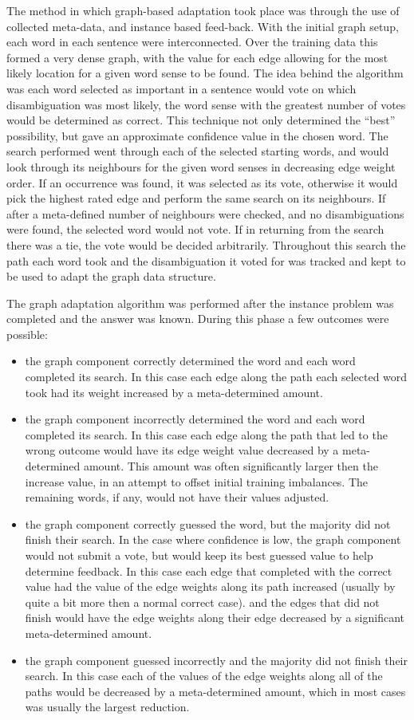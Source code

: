 The method in which graph-based adaptation took place was through the use of
collected meta-data, and instance based feed-back.  With the initial graph
setup, each word in each sentence were interconnected. Over the training data
this formed a very dense graph, with the value for each edge allowing for the
most likely location for a given word sense to be found.  The idea behind the
algorithm was each word selected as important in a sentence would vote on which
disambiguation was most likely, the word sense with the greatest number of votes
would be determined as correct.  This technique not only determined the ``best''
possibility, but gave an approximate confidence value in the chosen word. The
search performed went through each of the selected starting words, and would
look through its neighbours for the given word senses in decreasing edge weight
order. If an occurrence was found, it was selected as its vote, otherwise it
would pick the highest rated edge and perform the same search on its neighbours.
If after a meta-defined number of neighbours were checked, and no
disambiguations were found, the selected word would not vote.  If in returning
from the search there was a tie, the vote would be decided arbitrarily.
Throughout this search the path each word took and the disambiguation it voted
for was tracked and kept to be used to adapt the graph data structure.

The graph adaptation algorithm was performed after the instance problem was
completed and the answer was known.  During this phase a few outcomes were
possible: \begin{itemize}      \item the graph component correctly determined
the word and each word completed its search.  In this case each edge along the
path each selected word took had its weight increased by a meta-determined
amount.      \item the graph component incorrectly determined the word and each
word completed its search. In this case each edge along the path that led to the
wrong outcome would have its edge weight value decreased by a meta-determined
amount. This amount was often significantly larger then the increase value, in
an attempt to offset initial training imbalances. The remaining words, if any,
would not have their values adjusted.     \item the graph component correctly
guessed the word, but the majority did not finish their search. In the case
where confidence is low, the graph component would not submit a vote, but would
keep its best guessed value to help determine feedback. In this case each edge
that completed with the correct value had the value of the edge weights along
its path increased (usually by quite a bit more then a normal correct case). and
the edges that did not finish would have the edge weights along their edge
decreased by a significant meta-determined amount.     \item the graph component
guessed incorrectly and the majority did not finish their search. In this case
each of the values of the edge weights along all of the paths would be decreased
by a meta-determined amount, which in most cases was usually the largest
reduction. \end{itemize}

